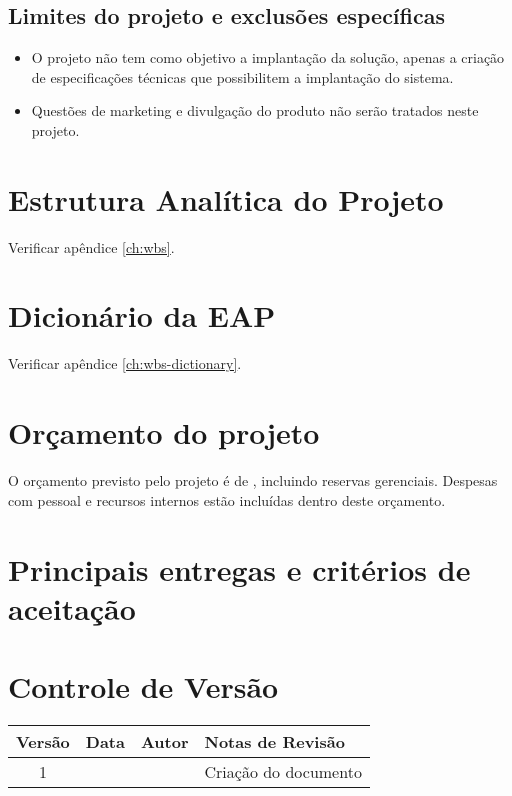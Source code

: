 \subsection{Limites do projeto e exclusões específicas}

\begin{itemize}
\item O projeto não tem como objetivo a implantação da solução, apenas a criação de especificações técnicas que possibilitem a implantação do sistema.
\item Questões de marketing e divulgação do produto não serão tratados neste projeto.
\end{itemize}

\section{Estrutura Analítica do Projeto}

Verificar apêndice \ref{ch:wbs}.

\section{Dicionário da EAP}

Verificar apêndice \ref{ch:wbs-dictionary}.

\section{Orçamento do projeto}

O orçamento previsto pelo projeto é de \maximumBudget, incluindo reservas gerenciais. Despesas com pessoal e recursos internos estão incluídas dentro deste orçamento.

\section{Principais entregas e critérios de aceitação}


\section{Controle de Versão}

\begin{table}[H]
	\begin{tabularx}{\textwidth}{| c | c | X | X |}
		\hline
		\textbf{Versão} & \textbf{Data} & \textbf{Autor}      & \textbf{Notas de Revisão} \\
		\hline
		1                &               & \projectManagerName & Criação do documento     \\
		\hline
	\end{tabularx}
	\centering
\end{table}

